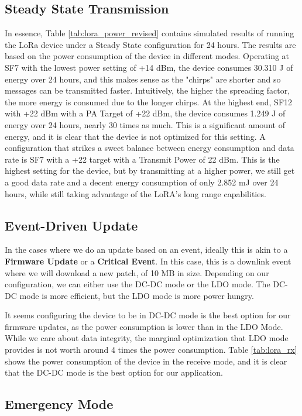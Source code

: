 \subsection{Steady State Transmission}
In essence, Table \ref{tab:lora_power_revised} contains simulated results of running the LoRa device under a Steady State configuration for 24 hours. The results are based on the power consumption of the device in different modes. Operating at SF7 with the lowest power setting of +14 dBm, the device consumes 30.310 J of energy over 24 hours, and this makes sense as the "chirps" are shorter and so messages can be transmitted faster. Intuitively, the higher the spreading factor, the more energy is consumed due to the longer chirps. At the highest end, SF12 with +22 dBm with a PA Target of +22 dBm, the device consumes 1.249 J of energy over 24 hours, nearly 30 times as much. This is a significant amount of energy, and it is clear that the device is not optimized for this setting. A configuration that strikes a sweet balance between energy consumption and data rate is SF7 with a +22 target with a Transmit Power of 22 dBm. This is the highest setting for the device, but by transmitting at a higher power, we still get a good data rate and a decent energy consumption of only 2.852 mJ over 24 hours, while still taking advantage of the LoRA's long range capabilities.

\subsection{Event-Driven Update}
In the cases where we do an update based on an event, ideally this is akin to a \textbf{Firmware Update} or a \textbf{Critical Event}. In this case, this is a downlink event where we will download a new patch, of 10 MB in size. Depending on our configuration, we can either use the DC-DC mode or the LDO mode. The DC-DC mode is more efficient, but the LDO mode is more power hungry.


It seems configuring the device to be in DC-DC mode is the best option for our firmware updates, as the power consumption is lower than in the LDO Mode. While we care about data integrity, the marginal optimization that LDO mode provides is not worth around 4 times the power consumption. Table \ref{tab:lora_rx} shows the power consumption of the device in the receive mode, and it is clear that the DC-DC mode is the best option for our application.

\subsection{Emergency Mode}

